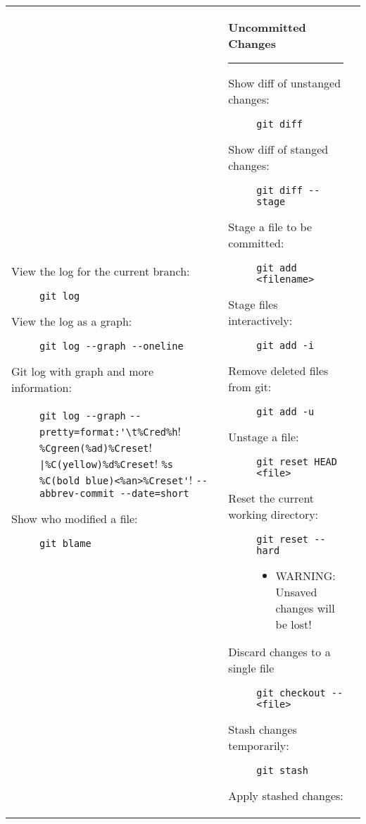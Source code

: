 \documentclass[landscape]{article}
\begin{document}
\begin{tabular*}{10.5in}{|p{2.9in}|p{2.9in}|p{2.9in}|}
\begin{flushleft}
\begin{description}
            \item[View the log for the current branch:]
                {\verb!git log!}
            \item[View the log as a graph:]
                {\verb!git log --graph --oneline!}
            \item[Git log with graph and more information:]
                 {\verb!git log --graph!
                  \verb!--pretty=format:'\t%Cred%h!
                  \verb!%Cgreen(%ad)%Creset!
                  \verb!|%C(yellow)%d%Creset!
                  \verb!%s %C(bold blue)<%an>%Creset'!
                  \verb!--abbrev-commit --date=short!}
            \item[Show who modified a file:]
                {\verb!git blame!}
        \end{description}
    \end{flushleft}
    &
    \begin{flushleft}
        \textbf{\large{Uncommitted Changes}}
        \rule{2.9in}{.5pt}
        \small
        \begin{description}
            \item[Show diff of unstanged changes:]
                {\verb!git diff!}
            \item[Show diff of stanged changes:]
                {\verb!git diff --stage!}
            \item[Stage a file to be committed:]
                {\verb!git add <filename>!}
            \item[Stage files interactively:]
                {\verb!git add -i!}
            \item[Remove deleted files from git:]
                {\verb!git add -u!}
            \item[Unstage a file:]
                {\verb!git reset HEAD <file>!}
            \item[Reset the current working directory:]
                {\verb!git reset --hard!}
                \begin{itemize}
                    \item{WARNING: Unsaved changes will be lost!}
                \end{itemize}
            \item[Discard changes to a single file]
                {\verb!git checkout -- <file>!}
            \item[Stash changes temporarily:]
                {\verb!git stash!}
            \item[Apply stashed changes:]

\end{description}
\end{flushleft}
\end{tabular*}
\end{document}
